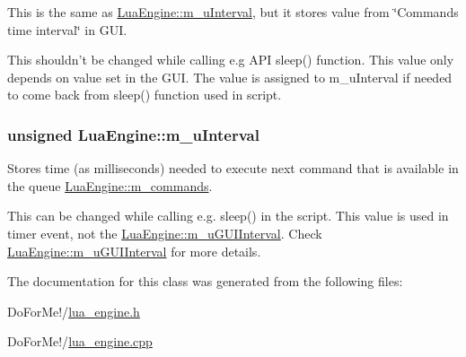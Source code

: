 This is the same as \hyperlink{class_lua_engine_af25b4a96c17c157ae110afa1dd0866ec}{Lua\-Engine\-::m\-\_\-u\-Interval}, but it stores value from \char`\"{}\-Commands time interval\char`\"{} in G\-U\-I. 

This shouldn't be changed while calling e.\-g A\-P\-I sleep() function. This value only depends on value set in the G\-U\-I. The value is assigned to m\-\_\-u\-Interval if needed to come back from sleep() function used in script. \hypertarget{class_lua_engine_af25b4a96c17c157ae110afa1dd0866ec}{
\subsubsection[{m\-\_\-u\-Interval}]{\setlength{\rightskip}{0pt plus 5cm}unsigned Lua\-Engine\-::m\-\_\-u\-Interval\hspace{0.3cm}{\ttfamily [private]}}}\label{class_lua_engine_af25b4a96c17c157ae110afa1dd0866ec}


Stores time (as milliseconds) needed to execute next command that is available in the queue \hyperlink{class_lua_engine_a86a3f32127e36e1ccce6c5a42a298ad5}{Lua\-Engine\-::m\-\_\-commands}. 

This can be changed while calling e.\-g. sleep() in the script. This value is used in timer event, not the \hyperlink{class_lua_engine_ac7d00771a353cc9afa586a6ec10f5d90}{Lua\-Engine\-::m\-\_\-u\-G\-U\-I\-Interval}. Check \hyperlink{class_lua_engine_ac7d00771a353cc9afa586a6ec10f5d90}{Lua\-Engine\-::m\-\_\-u\-G\-U\-I\-Interval} for more details. 

The documentation for this class was generated from the following files\-:\begin{DoxyCompactItemize}
\item 
Do\-For\-Me!/\hyperlink{lua__engine_8h}{lua\-\_\-engine.\-h}\item 
Do\-For\-Me!/\hyperlink{lua__engine_8cpp}{lua\-\_\-engine.\-cpp}\end{DoxyCompactItemize}
